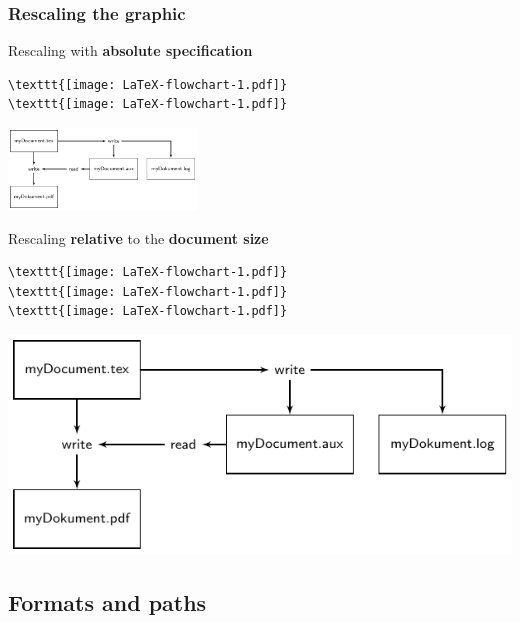 \begin{frame}[fragile]
\frametitle{Rescaling the graphic}

Rescaling with \textbf{absolute specification} 


\begin{lstlisting}
\texttt{[image: LaTeX-flowchart-1.pdf]}
\texttt{[image: LaTeX-flowchart-1.pdf]}
\end{lstlisting}

\includegraphics[width=5cm]{../../texfiles-beamer/tex-material/WissArb-latex/LaTeX-flowchart-1}

Rescaling \textbf{relative} to the \textbf{document size}

\begin{lstlisting}
\texttt{[image: LaTeX-flowchart-1.pdf]}  
\texttt{[image: LaTeX-flowchart-1.pdf]}
\texttt{[image: LaTeX-flowchart-1.pdf]}
\end{lstlisting}


\includegraphics[width=.2\linewidth]{../../texfiles-beamer/tex-material/WissArb-latex/LaTeX-flowchart-1}
\end{frame}


\subsection{Formats and paths}


